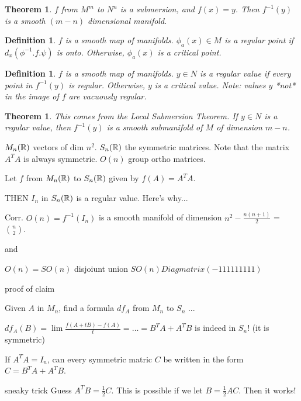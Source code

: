 \documentclass[11pt,leqno,oneside]{amsart}
\theoremstyle{mystyle} \newtheorem{thrm}[thm]{Theorem}
\theoremstyle{mystyle} \newtheorem{defi}[thm]{Definition}
\begin{document}
\begin{thrm}
	$f$ from $M^m$ to $N^n$ is a submersion, and $f(x) = y$.  Then $f^{-1}(y)$ is a smooth $(m-n)$ dimensional manifold.
\end{thrm}

\begin{defi}
	$f$ is a smooth map of manifolds.
	$\phi_a(x) \in M$ is a \emph{regular} point if $d_x(\phi^{-1}.f.\psi)$ is onto.  Otherwise, $\phi_a(x)$ is a \emph{critical} point.
\end{defi}

\begin{defi}
	$f$ is a smooth map of manifolds.
	$y \in N$ is a \emph{regular} value if every point in $f^{-1}(y)$ is regular.  Otherwise, $y$ is a \emph{critical} value.  Note: values $y$ *not* in the image of $f$ are vacuously regular.
\end{defi}

\begin{thrm}
	This comes from the Local Submersion Theorem.  If $y \in N$ is a regular value, then $f^{-1}(y)$ is a smooth submanifold of $M$ of dimension $m-n$.
\end{thrm}

\begin{example}
	$M_n({\mathbb R})$ vectors of dim $n^2$.  $S_n({\mathbb R})$ the symmetric matrices.  Note that the matrix $A^T A$ is always symmetric.  $O(n)$ group ortho matrices.

	Let $f$ from $M_n({\mathbb R})$ to $S_n({\mathbb R})$ given by $f(A) = A^T A$.

	THEN $I_n$ in $S_n({\mathbb R})$ is a regular value.  Here's why...

	Corr. $O(n) = f^{-1}(I_n)$ is a smooth manifold of dimension $n^2 - \frac{n(n+1)}{2}$ = $\binom n2$.

	and

	$O(n) = SO(n)$ disjoiunt union $SO(n)Diagmatrix(-1 1 1 1 1 1 1 1 1)$

	proof of claim

	Given $A$ in $M_n$, find a formula $df_A$ from $M_n$ to $S_n$ ...

	$df_A(B) = \lim \frac{f(A+tB) - f(A)}{t} = \ldots = B^T A + A^T B$
	is indeed in $S_n$! (it is symmetric)

	If $A^T A = I_n$, can every symmetric matric $C$ be written in the form $C = B^T A + A^T B$.

	sneaky trick
	Guess $A^T B = \frac12 C$.
	This is possible if we let $B = \frac12 AC$.
	Then it works!
\end{example}
\end{document}
